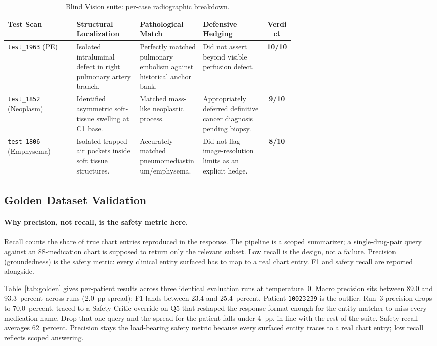 \documentclass[twocolumn,10pt,main=USenglish]{asmeconf}
\begin{document}
\begin{table}[t]
\centering
\caption{Blind Vision suite: per-case radiographic breakdown.}
\label{tab:vision}
\small
\begin{tabular}{@{}lL{0.22\linewidth}L{0.22\linewidth}L{0.22\linewidth}c@{}}
\toprule
\textbf{Test Scan} & \textbf{Structural Localization} & \textbf{Pathological Match} & \textbf{Defensive Hedging} & \textbf{Verdict}\\
\midrule
\texttt{test\_1963} (PE) & Isolated intraluminal defect in right pulmonary artery branch. & Perfectly matched pulmonary embolism against historical anchor bank. & Did not assert beyond visible perfusion defect. & \textbf{10/10}\\
\addlinespace
\texttt{test\_1852} (Neoplasm) & Identified asymmetric soft-tissue swelling at C1 base. & Matched mass-like neoplastic process. & Appropriately deferred definitive cancer diagnosis pending biopsy. & \textbf{9/10}\\
\addlinespace
\texttt{test\_1806} (Emphysema) & Isolated trapped air pockets inside soft tissue structures. & Accurately matched pneumomediastinum/emphysema. & Did not flag image-resolution limits as an explicit hedge. & \textbf{8/10}\\
\bottomrule
\end{tabular}
\end{table}

\subsection{Golden Dataset Validation}
\label{sec:golden}

\paragraph*{Why precision, not recall, is the safety metric here.}
Recall counts the share of true chart entries reproduced in the
response. The pipeline is a scoped summarizer; a single-drug-pair
query against an \num{88}-medication chart is supposed to return
only the relevant subset. Low recall is the design, not a failure.
Precision (groundedness) is the safety metric: every clinical
entity surfaced has to map to a real chart entry. F1 and safety
recall are reported alongside.

Table~\ref{tab:golden} gives per-patient results across three
identical evaluation runs at temperature~0. Macro precision sits
between \num{89.0} and \num{93.3}~percent across runs (\num{2.0}~pp
spread); F1 lands between \num{23.4} and \num{25.4}~percent.
Patient \texttt{10023239} is the outlier. Run~3 precision drops to
\num{70.0}~percent, traced to a Safety Critic override on Q5 that
reshaped the response format enough for the entity matcher to miss
every medication name. Drop that one query and the spread for the
patient falls under \num{4}~pp, in line with the rest of the suite.
Safety recall averages \num{62}~percent. Precision stays the
load-bearing safety metric because every surfaced entity traces to
a real chart entry; low recall reflects scoped answering.
\end{document}
